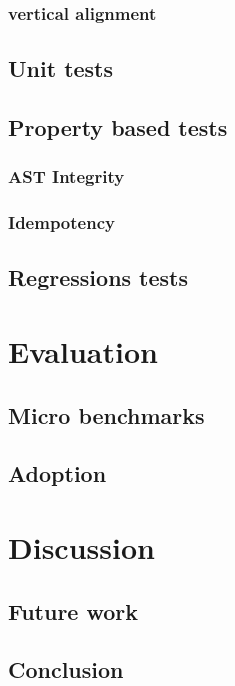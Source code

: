\documentclass[11pt,a4paper]{article}
\begin{document}
\subsubsection{vertical alignment}
\subsection{Unit tests}
\subsection{Property based tests}
\subsubsection{AST Integrity}
\subsubsection{Idempotency}
\subsection{Regressions tests}
\section{Evaluation}
\subsection{Micro benchmarks}
\subsection{Adoption}\label{sec:adoption}
\section{Discussion}
\subsection{Future work}
\subsection{Conclusion}
\printbibliography{}
\end{document}
